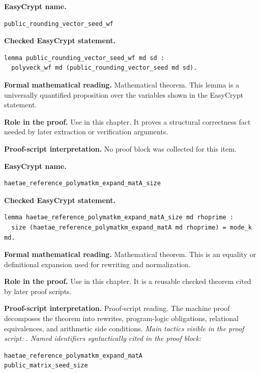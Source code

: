 \begin{formaltheorem}
\noindent\textbf{EasyCrypt name.}
\begin{lstlisting}[language=EasyCrypt,basicstyle=\ttfamily\scriptsize]
public_rounding_vector_seed_wf
\end{lstlisting}
\noindent\textbf{Checked EasyCrypt statement.}
\begin{lstlisting}[language=EasyCrypt,basicstyle=\ttfamily\scriptsize]
lemma public_rounding_vector_seed_wf md sd :
  polyveck_wf md (public_rounding_vector_seed md sd).
\end{lstlisting}
\noindent\textbf{Formal mathematical reading.}
Mathematical theorem. This lemma is a universally quantified proposition over the variables shown in the EasyCrypt statement.

\noindent\textbf{Role in the proof.}
Use in this chapter. It proves a structural correctness fact needed by later extraction or verification arguments.

\noindent\textbf{Proof-script interpretation.}
No proof block was collected for this item.

\end{formaltheorem}

\begin{formaltheorem}
\noindent\textbf{EasyCrypt name.}
\begin{lstlisting}[language=EasyCrypt,basicstyle=\ttfamily\scriptsize]
haetae_reference_polymatkm_expand_matA_size
\end{lstlisting}
\noindent\textbf{Checked EasyCrypt statement.}
\begin{lstlisting}[language=EasyCrypt,basicstyle=\ttfamily\scriptsize]
lemma haetae_reference_polymatkm_expand_matA_size md rhoprime :
  size (haetae_reference_polymatkm_expand_matA md rhoprime) = mode_k md.
\end{lstlisting}
\noindent\textbf{Formal mathematical reading.}
Mathematical theorem. This is an equality or definitional expansion used for rewriting and normalization.

\noindent\textbf{Role in the proof.}
Use in this chapter. It is a reusable checked theorem cited by later proof scripts.

\noindent\textbf{Proof-script interpretation.}
Proof-script reading. The machine proof decomposes the theorem into rewrites, program-logic obligations, relational equivalences, and arithmetic side conditions.
\emph{Main tactics visible in the proof script:} .
\emph{Named identifiers syntactically cited in the proof block:}
\begin{lstlisting}[language=EasyCrypt,basicstyle=\ttfamily\scriptsize]
haetae_reference_polymatkm_expand_matA
public_matrix_seed_size
\end{lstlisting}

\end{formaltheorem}

